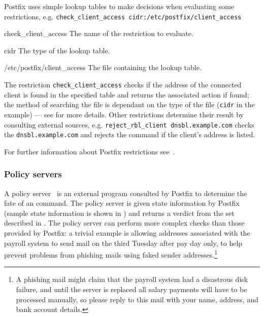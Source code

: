 Postfix uses simple lookup tables to make decisions when evaluating some
restrictions, e.g.\newline{}
\tab{}\texttt{check\_client\_access~cidr:/etc/postfix/client\_access}

\begin{eqlist}

    \item [check\_client\_access] The name of the restriction to evaluate.

    \item [cidr] The type of the lookup table.

    \item [/etc/postfix/client\_access] The file containing the lookup
        table.

\end{eqlist}

The restriction \texttt{check\_client\_access} checks if the \IP{} address
of the connected client is found in the specified table and returns the
associated action if found; the method of searching the file is dependant
on the type of the file (\texttt{cidr} in the example) --- see
\cite{postfix-lookup-tables} for more details.  Other restrictions
determine their result by consulting external sources, e.g.\newline{}
\tab{}\texttt{reject\_rbl\_client dnsbl.example.com}\newline{} checks the
\DNSBL{} \texttt{dnsbl.example.com} and rejects the command if the client's
\IP{} address is listed.

For further information about Postfix restrictions
see~\cite{smtpd_access_readme,smtpd_per_user_control,policy-servers}.

\subsubsection{Policy servers}

\label{policy servers}

A policy server~\cite{policy-servers} is an external program consulted by
Postfix to determine the fate of an \SMTP{} command.  The policy server is
given state information by Postfix (sample state information is shown in
) and returns a verdict
from the set described in .  The policy server can perform more complex checks than
those provided by Postfix: a trivial example is allowing addresses
associated with the payroll system to send mail on the third Tuesday after
pay day only, to help prevent problems from phishing mails using faked
sender addresses.\footnote{A phishing mail might claim that the payroll
system had a disastrous disk failure, and until the server is replaced all
salary payments will have to be processed manually, so please reply to this
mail with your name, address, and bank account details.}

